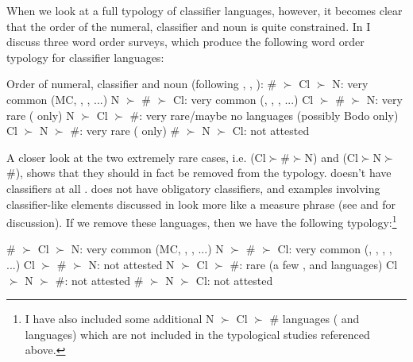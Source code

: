 \documentclass[output=paper
,modfonts
,nonflat]{langsci/langscibook}
\begin{document}
When we look at a full typology of classifier languages, however, it becomes clear that the order of the numeral, classifier and noun is quite constrained. In \citet{Hall2015} I discuss three word order surveys, which produce the following word order typology for classifier languages:\largerpage[1.5]

\ea \label{ex:hall:53}
Order of numeral, classifier and noun (following \citealt{Jones1970}, \citealt{Greenberg1972}, \citealt{Aikhenvald2000}):
\ea \# $\succ$ Cl $\succ$ N: very common (MC, , , ...)
\ex N $\succ$ \# $\succ$ Cl: very common (, , , ...)
\ex Cl $\succ$ \# $\succ$ N: very rare ( only)
\ex N $\succ$ Cl $\succ$ \#: very rare/maybe no languages (possibly Bodo only)
\ex Cl $\succ$ N $\succ$ \#: very rare ( only)
\ex \# $\succ$ N $\succ$ Cl: not attested
\z
\z

A closer look at the two extremely rare cases, i.e.  (Cl$\succ$\#$\succ$N) and  (Cl$\succ$N$\succ$\#), shows that they should in fact be removed from the typology.  doesn't have classifiers at all \citep{Essien1990}.  does not have obligatory classifiers, and examples involving classifier-like elements discussed in \citet{Greenberg1972} look more like a measure phrase (see \citealt{Watters1981} and \citealt{Hall2015} for discussion). If we remove these languages, then we have the following typology:\footnote{I have also included some additional N $\succ$ Cl $\succ$ \# languages ( and  languages) which are not included in the typological studies referenced above.}

\ea \label{ex:hall:54}
\ea \# $\succ$ Cl $\succ$ N: very common (MC, , , ...)
\ex N $\succ$ \# $\succ$ Cl: very common (, , , , ...)
\ex Cl $\succ$ \# $\succ$ N: not attested
\ex N $\succ$ Cl $\succ$ \#: rare (a few ,  and  languages)
\ex Cl $\succ$ N $\succ$ \#: not attested
\ex \# $\succ$ N $\succ$ Cl: not attested
\z
\z
\end{document}
